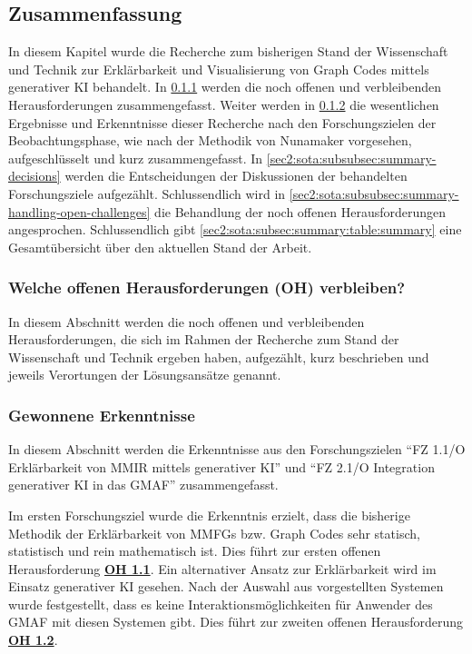 \clearpage

\subsection{Zusammenfassung}
\label{sec2:sota:subsec:summary}
In diesem Kapitel wurde die Recherche zum bisherigen Stand der Wissenschaft und Technik zur Erklärbarkeit und Visualisierung von Graph Codes mittels generativer KI behandelt.
In \cref{sec2:sota:subsubsec:summary-remaining-open-challenges} werden die noch offenen und verbleibenden Herausforderungen zusammengefasst.
Weiter werden in \cref{sec2:sota:subsubsec:summary-findings} die wesentlichen Ergebnisse und Erkenntnisse dieser Recherche nach den Forschungszielen der Beobachtungsphase, wie nach der Methodik von Nunamaker vorgesehen, aufgeschlüsselt und kurz zusammengefasst.
In \cref{sec2:sota:subsubsec:summary-decisions} werden die Entscheidungen der Diskussionen der behandelten Forschungsziele aufgezählt.
Schlussendlich wird in \cref{sec2:sota:subsubsec:summary-handling-open-challenges} die Behandlung der noch offenen Herausforderungen angesprochen.
Schlussendlich gibt \cref{sec2:sota:subsec:summary:table:summary} eine Gesamtübersicht über den aktuellen Stand der Arbeit.

\subsubsection{Welche offenen Herausforderungen (OH) verbleiben?}
\label{sec2:sota:subsubsec:summary-remaining-open-challenges}
In diesem Abschnitt werden die noch offenen und verbleibenden Herausforderungen, die sich im Rahmen der Recherche zum Stand der Wissenschaft und Technik ergeben haben, aufgezählt, kurz beschrieben und jeweils Verortungen der Lösungsansätze genannt.



\subsubsection{Gewonnene Erkenntnisse}
\label{sec2:sota:subsubsec:summary-findings}
In diesem Abschnitt werden die Erkenntnisse aus den Forschungszielen \enquote{FZ 1.1/O Erklärbarkeit von MMIR mittels generativer KI} und \enquote{FZ 2.1/O Integration generativer KI in das GMAF} zusammengefasst.

Im ersten Forschungsziel wurde die Erkenntnis erzielt, dass die bisherige Methodik der Erklärbarkeit von MMFGs bzw. Graph Codes sehr statisch, statistisch und rein mathematisch ist.
Dies führt zur ersten offenen Herausforderung \hyperref[sec2:sota:oi:1.1]{\textbf{OH 1.1}}.
Ein alternativer Ansatz zur Erklärbarkeit wird im Einsatz generativer KI gesehen.
Nach der Auswahl aus vorgestellten Systemen wurde festgestellt, dass es keine Interaktionsmöglichkeiten für Anwender des GMAF mit diesen Systemen gibt.
Dies führt zur zweiten offenen Herausforderung \hyperref[sec2:sota:oi:1.2]{\textbf{OH 1.2}}.

